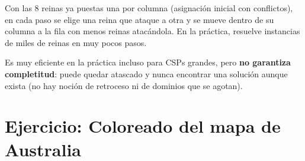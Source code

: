 \begin{example}
    Con las 8 reinas ya puestas una por columna (asignación inicial con conflictos), en cada paso se elige una reina que
    ataque a otra y se mueve dentro de su columna a la fila con menos reinas atacándola. En la práctica, resuelve
    instancias de miles de reinas en muy pocos pasos.
\end{example}

Es muy eficiente en la práctica incluso para CSPs grandes, pero \textbf{no garantiza completitud}: puede quedar
atascado y nunca encontrar una solución aunque exista (no hay noción de retroceso ni de dominios que se agotan).

\section{Ejercicio: Coloreado del mapa de Australia}

